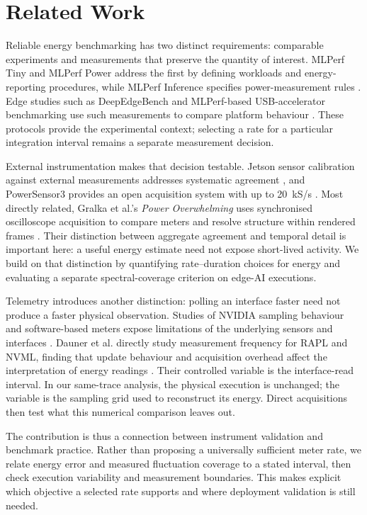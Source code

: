 \section{Related Work}
Reliable energy benchmarking has two distinct requirements: comparable experiments and measurements that preserve the quantity of interest. MLPerf Tiny and MLPerf Power address the first by defining workloads and energy-reporting procedures, while MLPerf Inference specifies power-measurement rules \cite{banbury2021mlperftiny,tschand2024mlperfpower,mlcommonsInferencePower}. Edge studies such as DeepEdgeBench and MLPerf-based USB-accelerator benchmarking use such measurements to compare platform behaviour \cite{baller2021,libutti2020usbaccelerators}. These protocols provide the experimental context; selecting a rate for a particular integration interval remains a separate measurement decision.

External instrumentation makes that decision testable. Jetson sensor calibration against external measurements addresses systematic agreement \cite{shalavi2023jetsoncalibration}, and PowerSensor3 provides an open acquisition system with up to 20~kS/s \cite{vanderVlugt2025powersensor3}. Most directly related, Gralka et al.'s \emph{Power Overwhelming} uses synchronised oscilloscope acquisition to compare meters and resolve structure within rendered frames \cite{gralka2024poweroverwhelming}. Their distinction between aggregate agreement and temporal detail is important here: a useful energy estimate need not expose short-lived activity. We build on that distinction by quantifying rate--duration choices for energy and evaluating a separate spectral-coverage criterion on edge-AI executions.

Telemetry introduces another distinction: polling an interface faster need not produce a faster physical observation. Studies of NVIDIA sampling behaviour and software-based meters expose limitations of the underlying sensors and interfaces \cite{yang2024parttime,jay2023softwarepowermeters}. Dauner et al. directly study measurement frequency for RAPL and NVML, finding that update behaviour and acquisition overhead affect the interpretation of energy readings \cite{dauner2026frequency}. Their controlled variable is the interface-read interval. In our same-trace analysis, the physical execution is unchanged; the variable is the sampling grid used to reconstruct its energy. Direct acquisitions then test what this numerical comparison leaves out.

The contribution is thus a connection between instrument validation and benchmark practice. Rather than proposing a universally sufficient meter rate, we relate energy error and measured fluctuation coverage to a stated interval, then check execution variability and measurement boundaries. This makes explicit which objective a selected rate supports and where deployment validation is still needed.
